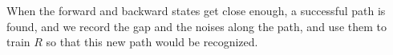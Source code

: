 \documentclass[orivec]{llncs}
\newcommand{\emp}[1]{\textbf{#1}}
\begin{document}
When the forward and backward states get close enough, a successful path is found, and we record the gap and the noises along the path, and use them to train $R$ so that this new path would be recognized.




\fi


\end{document}
